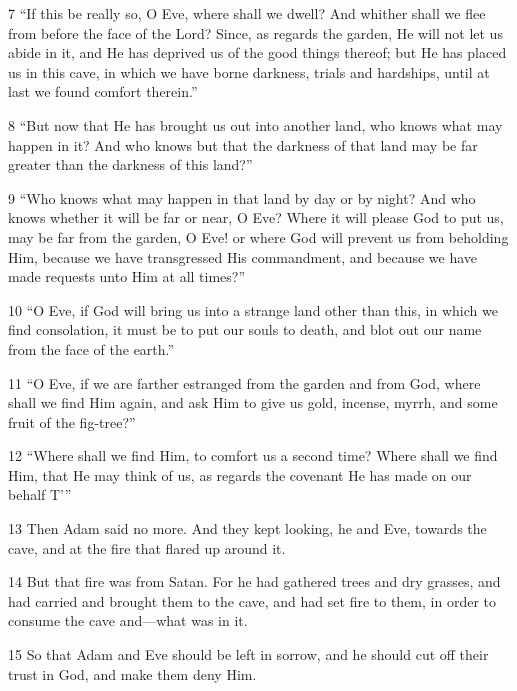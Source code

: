 \par 7 “If this be really so, O Eve, where shall we dwell? And whither shall we flee from before the face of the Lord? Since, as regards the garden, He will not let us abide in it, and He has deprived us of the good things thereof; but He has placed us in this cave, in which we have borne darkness, trials and hardships, until at last we found comfort therein.”

\par 8 “But now that He has brought us out into another land, who knows what may happen in it? And who knows but that the darkness of that land may be far greater than the darkness of this land?”

\par 9 “Who knows what may happen in that land by day or by night? And who knows whether it will be far or near, O Eve? Where it will please God to put us, may be far from the garden, O Eve! or where God will prevent us from beholding Him, because we have transgressed His commandment, and because we have made requests unto Him at all times?”

\par 10 “O Eve, if God will bring us into a strange land other than this, in which we find consolation, it must be to put our souls to death, and blot out our name from the face of the earth.”

\par 11 “O Eve, if we are farther estranged from the garden and from God, where shall we find Him again, and ask Him to give us gold, incense, myrrh, and some fruit of the fig-tree?”

\par 12 “Where shall we find Him, to comfort us a second time? Where shall we find Him, that He may think of us, as regards the covenant He has made on our behalf T'”

\par 13 Then Adam said no more. And they kept looking, he and Eve, towards the cave, and at the fire that flared up around it.

\par 14 But that fire was from Satan. For he had gathered trees and dry grasses, and had carried and brought them to the cave, and had set fire to them, in order to consume the cave and—what was in it.

\par 15 So that Adam and Eve should be left in sorrow, and he should cut off their trust in God, and make them deny Him.

